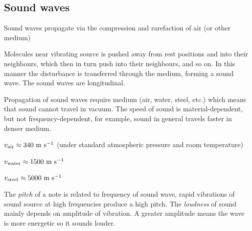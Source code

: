 \subsection{Sound waves}

Sound waves propagate via the compression and rarefaction of air (or other medium) 

Molecules near vibrating source is pushed away from rest positions and into their neighbours, which then in turn push into their neighbours, and so on. In this manner the disturbance is transferred through the medium, forming a sound wave. The sound waves are longitudinal.
	
\begin{figure}[ht]

\end{figure}

Propagation of sound waves require medium (air, water, steel, etc.) which means that sound cannot travel in vacuum. The speed of sound is material-dependent, but not frequency-dependent, for example, sound in general travels faster in denser medium.
	
	\titem $v_\text{air} \approx 340 \text{ m s$^{-1}$}$ (under standard atmospheric pressure and room temperature)
	
	\titem $v_\text{water} \approx 1500 \text{ m s$^{-1}$}$
	
	\titem $v_\text{steel} \approx 5000 \text{ m s$^{-1}$}$
	
The \emph{pitch} of a note is related to frequency of sound wave, rapid vibrations of sound source at high frequencies produce a high pitch. The \emph{loudness} of sound mainly depends on amplitude of vibration. A greater amplitude means the wave is more energetic so it sounds louder.
	
